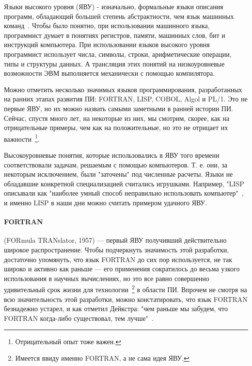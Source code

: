Языки высокого уровня (ЯВУ) - изначально, формальные языки описания программ, обладающий большей степень абстрактности, чем язык машинных команд~\cite{HLPL}. Чтобы было понятно, при использовании машинного языка, программист думает в понятиях регистров, памяти, машинных слов, бит и инструкций компьютера. При использовании языков высокого уровня программист использует числа, символы, строки, арифметические операции, типы и структуры данных. А трансляция этих понятий на низкоуровневые возможности ЭВМ выполняется механически с помощью компилятора.

Можно отметить несколько значимых языков программирования, разработанных на ранних этапах развития ПИ: FORTRAN, LISP, COBOL, Algol и PL/1. Это не первые ЯВУ, но их можно назвать самыми заметными в ранней истории ПИ. Сейчас, спустя много лет, на некоторые из них, мы смотрим, скорее, как на отрицательные примеры, чем как на положительные, но это не отрицает их важности~\footnote{Отрицательный опыт тоже важен.}.

Высокоуровневые понятия, которые использовались в ЯВУ того времени соответствовали задачам, решаемым с помощью компьютеров. Т. е. они, за некоторым исключением, были "заточены" под численные расчеты. Языки не обладавшие конкретной специализацией считались игрушками. Например, "LISP описывали как "наиболее умный способ неправильно использовать компьютер"~\cite{Dijkstra:1972:HP}, и именно LISP в наши дни можно считать примером удачного ЯВУ.

\paragraph{FORTRAN} (FORmula TRANslator, 1957) — первый ЯВУ получивший действительно широкое распространение. Чтобы подчеркнуть значимость этой разработки, достаточно упомянуть, что язык FORTRAN до сих пор используется, не так широко и активно как раньше — его применения сократилось до весьма узкого использования в научных вычислениях, но это все равно совершенно удивительный срок жизни для технологии~\footnote{Имеется ввиду именно FORTRAN, а не сама идея ЯВУ.} в области ПИ. Впрочем не смотря на всю значительность этой разработки, можно констатировать, что язык FORTRAN безнадежно устарел, и как отметил Дейкстра: "чем раньше мы забудем, что FORTRAN когда-либо существовал, тем лучше"~\cite{Dijkstra:1972:HP}.

